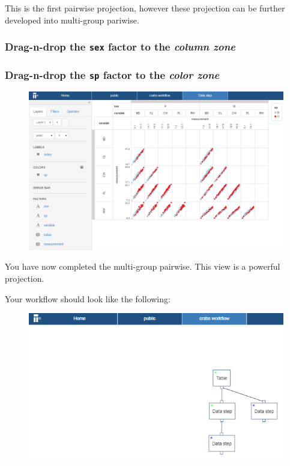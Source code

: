\documentclass[]{book}
\theoremstyle{definition}
\theoremstyle{definition}
\theoremstyle{remark}
\begin{document}
This is the first pairwise projection, however these projection can be
further developed into multi-group pariwise.

\subsubsection{\texorpdfstring{Drag-n-drop the \texttt{sex} factor to
the \emph{column
zone}}{Drag-n-drop the sex factor to the column zone}}\label{drag-n-drop-the-sex-factor-to-the-column-zone}

\subsubsection{\texorpdfstring{Drag-n-drop the \texttt{sp} factor to the
\emph{color
zone}}{Drag-n-drop the sp factor to the color zone}}\label{drag-n-drop-the-sp-factor-to-the-color-zone}

\begin{figure}[htbp]
\centering
\includegraphics{images/projection_pairwise_2.png}
\caption{}
\end{figure}

You have now completed the multi-group pairwise. This view is a powerful
projection.

Your workflow should look like the following:

\begin{figure}[htbp]
\centering
\includegraphics{images/workflow_crabs.png}
\caption{}
\end{figure}
\end{document}
